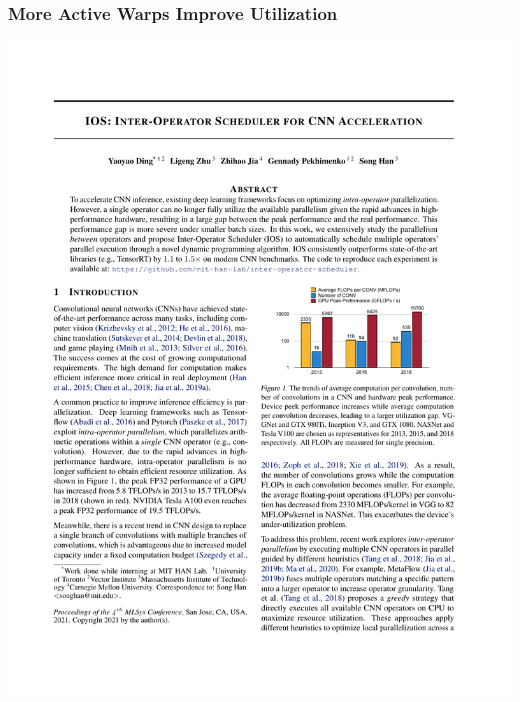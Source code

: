 \documentclass[12pt,aspectratio=169]{beamer}
\begin{document}
    \begin{frame}
        \frametitle{More Active Warps Improve Utilization}

        \begin{center}
            \includegraphics[page=8,trim=10.6cm 7.7cm 2.2cm 17cm,clip,scale=1.2]{paper.pdf}
        \end{center}
    \end{frame}
\end{document}
